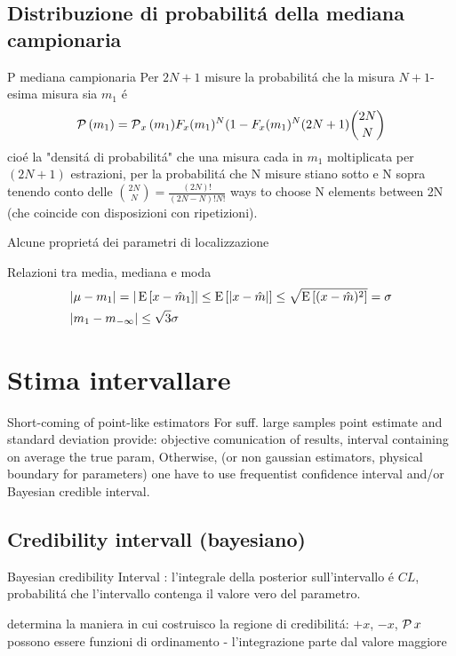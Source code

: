\documentclass[asd-beamer.tex]{subfiles}%
\begin{document}
\subsection{Distribuzione di probabilit\'a della mediana campionaria}

\begin{frame}{P mediana campionaria}
Per $2N+1$ misure la probabilit\'a che la misura $N+1$-esima misura sia $m_1$ \'e \[\operatorname{\mathcal{P}}{(m_1)}=\operatorname{\mathcal{P}}_x{(m_1)}F_x(m_1)^N(1-F_x(m_1)^N(2N+1)\binom{2N}{N}\] cio\'e la "densit\'a di probabilit\'a" che una misura cada in $m_1$ moltiplicata per $(2N+1)$ estrazioni, per la probabilit\'a che N misure stiano sotto e N sopra tenendo conto delle $\binom{2N}{N}=\frac{(2N)!}{(2N-N)!N!}$ ways to choose N elements between 2N (che coincide con disposizioni con ripetizioni).
\end{frame}

\begin{wordonframe}{Alcune propriet\'a dei parametri di localizzazione}
\begin{block}{Relazioni tra media, mediana e moda}
\begin{align*}
&|\mu-m_1|=|\operatorname{E}{[x-\hat{m}_1]}|\leq\operatorname{E}{[|x-\hat{m}|]}\leq\sqrt{\operatorname{E}{[(x-\hat{m})^2]}}=\sigma\\
&|m_1-m_{-\infty}|\leq\sqrt{3}\sigma
\end{align*}
\end{block}
\end{wordonframe}

\section{Stima intervallare}

\begin{frame}{Short-coming of point-like estimators}
For suff. large samples  point estimate and standard deviation provide: objective comunication of results, interval containing on average the true param, 
Otherwise, (or non gaussian estimators, physical boundary for parameters) one have to use frequentist confidence interval and/or Bayesian credible interval.
\end{frame}

\subsection{Credibility intervall (bayesiano)}

\begin{frame}[fragile]{Bayesian credibility Interval}
: l'integrale della posterior sull'intervallo \'e $CL$, probabilit\'a che l'intervallo contenga il valore vero del parametro.
\begin{block}{}
	determina la maniera in cui costruisco la regione di credibilit\'a: $+x$, $-x$, $\operatorname{\mathcal{P}}{x}$ possono essere funzioni di ordinamento - l'integrazione parte dal valore maggiore
\end{block}
\end{frame}
\end{document}
